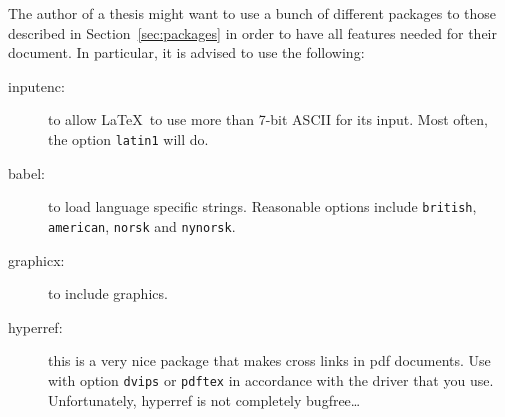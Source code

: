 The author of a thesis might want to use a bunch of different packages
to those described in Section~\ref{sec:packages} in order to have all features needed for their document. 
In particular, it is advised to use the following:
\begin{description}
	\item[inputenc:] to allow \LaTeX\ to use more than 7-bit ASCII for its
	  input. Most often, the option \texttt{latin1} will do.
	\item[babel:] to load language specific strings. Reasonable options
	  include \texttt{british}, 
		\texttt{american}, \texttt{norsk} and
	  \texttt{nynorsk}.
	\item[graphicx:] to include graphics.
	\item[hyperref:] this is a very nice package that makes cross links in
	  pdf documents. Use with option \texttt{dvips} or \texttt{pdftex}
	  in accordance with the driver that you use. Unfortunately, hyperref
	  is not completely bugfree\dots
\end{description}
